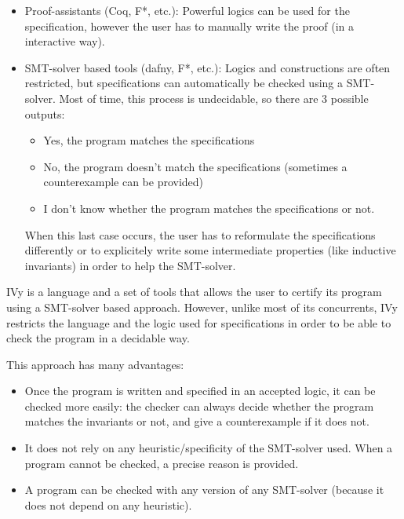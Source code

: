 \documentclass[11pt,a4paper,oldfontcommands,openany]{memoir}
\begin{document}
    \begin{itemize}
        \item Proof-assistants (Coq, F*, etc.):
        Powerful logics can be used for the specification,
        however the user has to manually write the proof (in a interactive way).
        \item SMT-solver based tools (dafny, F*, etc.):
        Logics and constructions are often restricted, but specifications can automatically be checked using a SMT-solver.
        Most of time, this process is undecidable,
        so there are 3 possible outputs:
        \begin{itemize}
            \item Yes, the program matches the specifications
            \item No, the program doesn't match the specifications (sometimes a counterexample can be provided)
            \item I don't know whether the program matches the specifications or not.
        \end{itemize}
        When this last case occurs, the user has to reformulate the specifications differently or to explicitely write some intermediate properties (like inductive invariants)
        in order to help the SMT-solver.
    \end{itemize}

    IVy\cite{Padon:2016:ISV:2908080.2908118} is a language and a set of tools that allows the user to certify its program using a SMT-solver based approach.
    However, unlike most of its concurrents, IVy restricts the language and the logic used for specifications
    in order to be able to check the program in a decidable way.

    This approach has many advantages:
    \begin{itemize}
        \item Once the program is written and specified in an accepted logic, it can be checked more easily:
        the checker can always decide whether the program matches the invariants or not, and give a counterexample if it does not.
        \item It does not rely on any heuristic/specificity of the SMT-solver used.
        When a program cannot be checked, a precise reason is provided.
        \item A program can be checked with any version of any SMT-solver (because it does not depend on any heuristic).
    \end{itemize}
    
\end{document}
